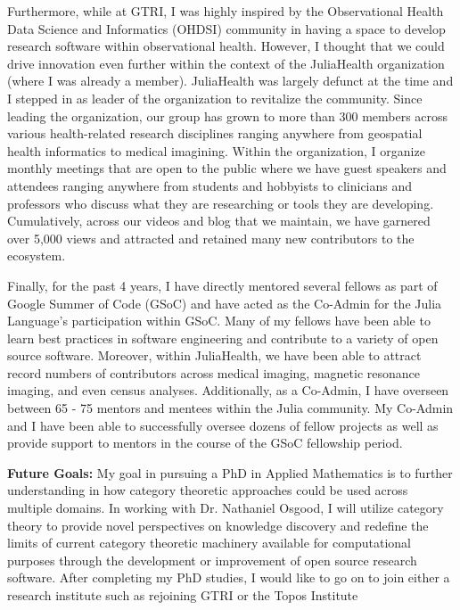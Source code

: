 \documentclass[11pt]{extarticle}
\begin{document}
Furthermore, while at GTRI, I was highly inspired by the Observational Health Data Science and Informatics (OHDSI) community in having a space to develop research software within observational health.
However, I thought that we could drive innovation even further within the context of the JuliaHealth organization (where I was already a member).
JuliaHealth was largely defunct at the time and I stepped in as leader of the organization to revitalize the community.
Since leading the organization, our group has grown to more than 300 members across various health-related research disciplines ranging anywhere from geospatial health informatics to medical imagining.
Within the organization, I organize monthly meetings that are open to the public where we have guest speakers and attendees ranging anywhere from students and hobbyists to clinicians and professors who discuss what they are researching or tools they are developing.
Cumulatively, across our videos and blog that we maintain, we have garnered over 5,000 views and attracted and retained many new contributors to the ecosystem.

Finally, for the past 4 years, I have directly mentored several fellows as part of Google Summer of Code (GSoC) and have acted as the Co-Admin for the Julia Language's participation within GSoC.
Many of my fellows have been able to learn best practices in software engineering and contribute to a variety of open source software.
Moreover, within JuliaHealth, we have been able to attract record numbers of contributors across medical imaging, magnetic resonance imaging, and even census analyses.
Additionally, as a Co-Admin, I have overseen between 65 - 75 mentors and mentees within the Julia community.
My Co-Admin and I have been able to successfully oversee dozens of fellow projects as well as provide support to mentors in the course of the GSoC fellowship period.

\textbf{Future Goals:} My goal in pursuing a PhD in Applied Mathematics is to further understanding in how category theoretic approaches could be used across multiple domains.
In working with Dr. Nathaniel Osgood, I will utilize category theory to provide novel perspectives on knowledge discovery and redefine the limits of current category theoretic machinery available for computational purposes through the development or improvement of open source research software.
After completing my PhD studies, I would like to go on to join either a research institute such as rejoining GTRI or the Topos Institute 
\end{document}
